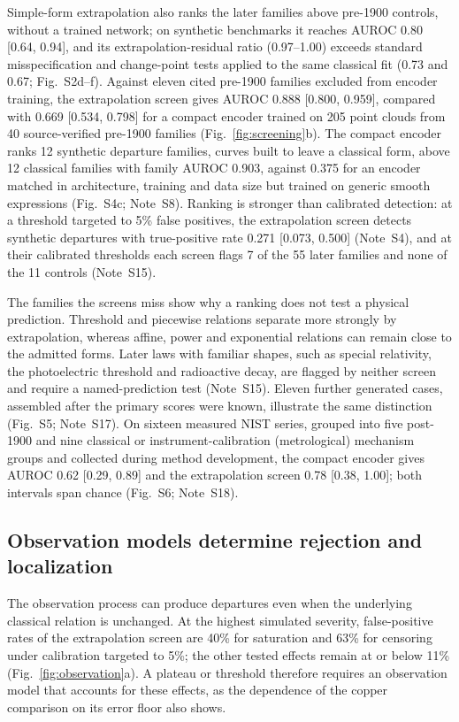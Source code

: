 \documentclass{article}
\begin{document}
Simple-form extrapolation also ranks the later families above pre-1900 controls, without a trained network; on synthetic benchmarks it reaches AUROC 0.80 [0.64, 0.94], and its extrapolation-residual ratio (0.97--1.00) exceeds standard misspecification and change-point tests applied to the same classical fit (0.73 and 0.67; Fig.~S2d--f). Against eleven cited pre-1900 families excluded from encoder training, the extrapolation screen gives AUROC 0.888 [0.800, 0.959], compared with 0.669 [0.534, 0.798] for a compact encoder trained on 205 point clouds from 40 source-verified pre-1900 families (Fig.~\ref{fig:screening}b). The compact encoder ranks 12 synthetic departure families, curves built to leave a classical form, above 12 classical families with family AUROC 0.903, against 0.375 for an encoder matched in architecture, training and data size but trained on generic smooth expressions (Fig.~S4c; Note~S8). Ranking is stronger than calibrated detection: at a threshold targeted to 5\% false positives, the extrapolation screen detects synthetic departures with true-positive rate 0.271 [0.073, 0.500] (Note~S4), and at their calibrated thresholds each screen flags 7 of the 55 later families and none of the 11 controls (Note~S15).

The families the screens miss show why a ranking does not test a physical prediction. Threshold and piecewise relations separate more strongly by extrapolation, whereas affine, power and exponential relations can remain close to the admitted forms. Later laws with familiar shapes, such as special relativity, the photoelectric threshold and radioactive decay, are flagged by neither screen and require a named-prediction test (Note~S15). Eleven further generated cases, assembled after the primary scores were known, illustrate the same distinction (Fig.~S5; Note~S17). On sixteen measured NIST series, grouped into five post-1900 and nine classical or instrument-calibration (metrological) mechanism groups and collected during method development, the compact encoder gives AUROC 0.62 [0.29, 0.89] and the extrapolation screen 0.78 [0.38, 1.00]; both intervals span chance (Fig.~S6; Note~S18).

\subsection{Observation models determine rejection and localization}

The observation process can produce departures even when the underlying classical relation is unchanged. At the highest simulated severity, false-positive rates of the extrapolation screen are 40\% for saturation and 63\% for censoring under calibration targeted to 5\%; the other tested effects remain at or below 11\% (Fig.~\ref{fig:observation}a). A plateau or threshold therefore requires an observation model that accounts for these effects, as the dependence of the copper comparison on its error floor also shows.
\end{document}
